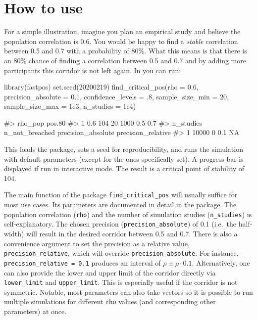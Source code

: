 \hypertarget{how-to-use}{%
\section{\texorpdfstring{How to use }{How to use }}\label{how-to-use}}

For a simple illustration, imagine you plan an empirical study and believe the population correlation is 0.6. You would be happy to find a \emph{stable} correlation between 0.5 and 0.7 with a probability of 80\%. What this means is that there is an 80\% chance of finding a correlation between 0.5 and 0.7 and by adding more participants this corridor is not left again. In  you can run:

\begin{Schunk}
\begin{Sinput}
library(fastpos)
set.seed(20200219)
find_critical_pos(rho = 0.6, precision_absolute = 0.1, confidence_levels = .8,
                  sample_size_min = 20, sample_size_max = 1e3, n_studies = 1e4)
\end{Sinput}
\begin{Soutput}
#>   rho_pop pos.80% sample_size_min sample_size_max lower_limit upper_limit
#> 1     0.6     104              20            1000         0.5         0.7
#>   n_studies n_not_breached precision_absolute precision_relative
#> 1     10000              0                0.1                 NA
\end{Soutput}
\end{Schunk}

This loads the package, sets a seed for reproducibility, and runs the simulation with default parameters (except for the ones specifically set). A progress bar is displayed if run in interactive mode. The result is a critical point of stability of 104.

The main function of the package \texttt{find\_critical\_pos} will usually suffice for most use cases. Its parameters are documented in detail in the package. The population correlation (\texttt{rho}) and the number of simulation studies (\texttt{n\_studies}) is self-explanatory. The chosen precision (\texttt{precision\_absolute}) of 0.1 (i.e.~the half-width) will result in the desired corridor between 0.5 and 0.7. There is also a convenience argument to set the precision as a relative value, \texttt{precision\_relative}, which will override \texttt{precision\_absolute}. For instance, \texttt{precision\_relative\ =\ 0.1} produces an interval of \(\rho \pm \rho \cdot 0.1\). Alternatively, one can also provide the lower and upper limit of the corridor directly via \texttt{lower\_limit} and \texttt{upper\_limit}. This is especially useful if the corridor is not symmetric. Notable, most parameters can also take vectors so it is possible to run multiple simulations for different \texttt{rho} values (and corresponding other parameters) at once.

